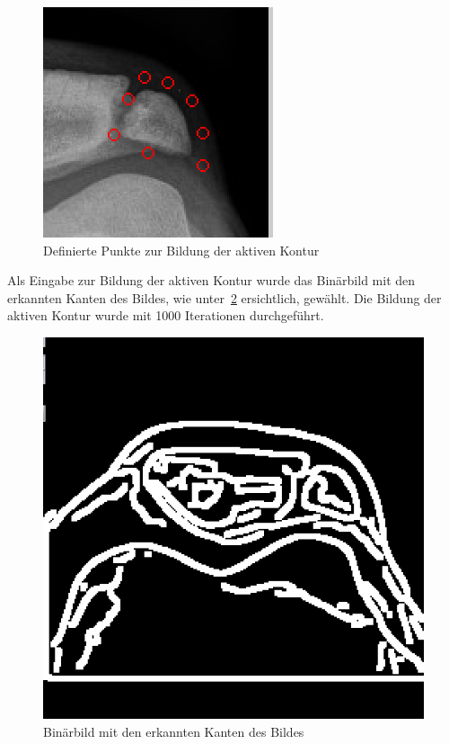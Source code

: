 \begin{figure}[h!]
    \centering
    \includegraphics[scale=0.5]{images/ownimpl_contour.png}
    \caption{Definierte Punkte zur Bildung der aktiven Kontur\protect\footnotemark[6]{}}
\label{fig:ownimpl_contour}
\end{figure}

Als Eingabe zur Bildung der aktiven Kontur wurde das Binärbild mit den erkannten Kanten des Bildes, wie unter~\ref{fig:ownimpl_edges} ersichtlich, gewählt. Die Bildung der aktiven Kontur wurde mit 1000 Iterationen durchgeführt.

\begin{figure}[H]
    \centering
    \includegraphics[scale=0.25]{images/ownimpl_edges.png}
    \caption{Binärbild mit den erkannten Kanten des Bildes\protect\footnotemark[6]{}}
\label{fig:ownimpl_edges}
\end{figure}
